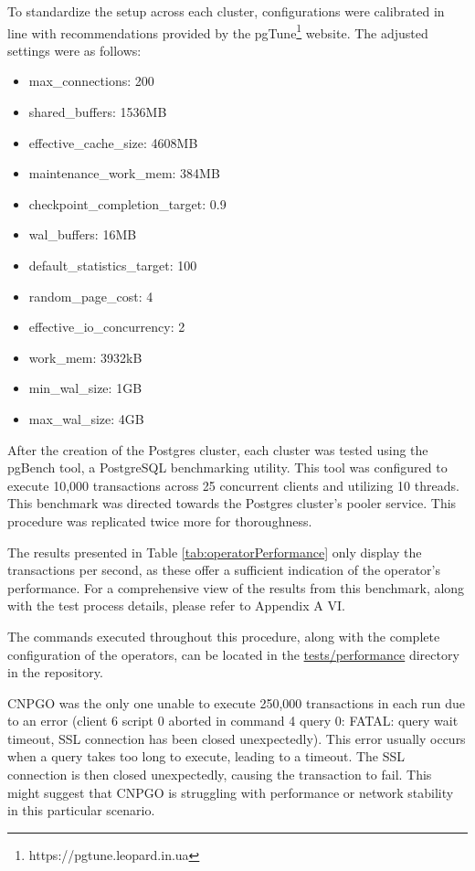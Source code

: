 To standardize the setup across each cluster, configurations were calibrated in line with recommendations provided by the pgTune\footnote[7]{https://pgtune.leopard.in.ua} website. The adjusted settings were as follows:
\begin{itemize}
    \item max\_connections: 200
    \item shared\_buffers: 1536MB
    \item effective\_cache\_size: 4608MB
    \item maintenance\_work\_mem: 384MB
    \item checkpoint\_completion\_target: 0.9
    \item wal\_buffers: 16MB
    \item default\_statistics\_target: 100
    \item random\_page\_cost: 4
    \item effective\_io\_concurrency: 2
    \item work\_mem: 3932kB
    \item min\_wal\_size: 1GB
    \item max\_wal\_size: 4GB
\end{itemize}

After the creation of the Postgres cluster, each cluster was tested using the pgBench tool, a PostgreSQL benchmarking utility. This tool was configured to execute 10,000 transactions across 25 concurrent clients and utilizing 10 threads. This benchmark was directed towards the Postgres cluster's pooler service. This procedure was replicated twice more for thoroughness.

The results presented in Table \ref{tab:operatorPerformance} only display the transactions per second, as these offer a sufficient indication of the operator's performance. For a comprehensive view of the results from this benchmark, along with the test process details, please refer to Appendix A VI.

The commands executed throughout this procedure, along with the complete configuration of the operators, can be located in the \url{tests/performance} directory in the repository.

CNPGO was the only one unable to execute 250,000 transactions in each run due to an error (client 6 script 0 aborted in command 4 query 0: FATAL: query wait timeout, SSL connection has been closed unexpectedly).
This error usually occurs when a query takes too long to execute, leading to a timeout. The SSL connection is then closed unexpectedly, causing the transaction to fail. This might suggest that CNPGO is struggling with performance or network stability in this particular scenario.

